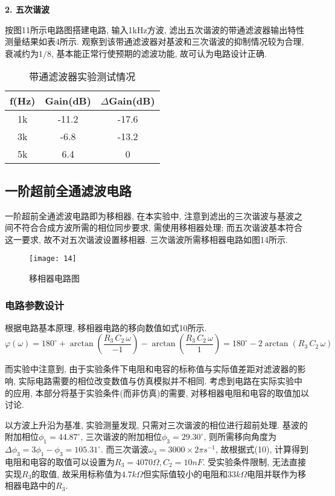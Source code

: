 \documentclass[UTF2]{ctexart}
\begin{document}
	\textbf{2. 五次谐波}
	
	按图11所示电路图搭建电路, 输入1kHz方波, 滤出五次谐波的带通滤波器输出特性测量结果如表4所示. 观察到该带通滤波器对基波和三次谐波的抑制情况较为合理, 衰减约为$1/8$, 基本能正常行使预期的滤波功能, 故可认为电路设计正确.
	
	\begin{table}[h]
		\centering
		\caption{带通滤波器实验测试情况}
		\begin{tabular}{c c c}
			\hline
			f(Hz) & Gain(dB) & $\Delta$Gain(dB)  \\
			\hline
			1k & -11.2 & -17.6 \\
			3k & -6.8 & -13.2 \\
			5k & 6.4 & 0 \\
			\hline
		\end{tabular}
	\end{table}
	
	\subsection{一阶超前全通滤波电路} 
	
	一阶超前全通滤波电路即为移相器, 在本实验中, 注意到滤出的三次谐波与基波之间不符合合成方波所需的相位同步要求, 需使用移相器处理; 而五次谐波基本符合这一要求, 故不对五次谐波设置移相器. 三次谐波所需移相器电路如图14所示. 
	
	\begin{figure}[h]
		\centering
		\texttt{[image: 14]}
		\caption{移相器电路图}
	\end{figure}
	
	\subsubsection{电路参数设计}
	
	根据电路基本原理, 移相器电路的移向数值如式10所示.
	\begin{equation}
		\varphi (\omega) = 180^\circ + \arctan \left( \frac{R_3 \, C_2 \, \omega}{-1} \right) - \arctan \left( \frac{R_3 \, C_2 \, \omega}{1} \right) = 180^\circ - 2\arctan (R_3 \, C_2 \, \omega)
	\end{equation}
	
	而实验中注意到, 由于实验条件下电阻和电容的标称值与实际值差距对滤波器的影响, 实际电路需要的相位改变数值与仿真模拟并不相同. 考虑到电路在实际实验中的应用, 本部分将基于实验条件(而非仿真)的需要, 对移相器电阻和电容的取值加以讨论. 
	
	以方波上升沿为基准, 实验测量发现, 只需对三次谐波的相位进行超前处理. 基波的附加相位$\phi_1 = 44.87^\circ$, 三次谐波的附加相位$\phi_3 = 29.30^\circ$, 则所需移向角度为$\Delta \phi_3 = 3\phi_1 - \phi_3 = 105.31^\circ$. 而三次谐波$\omega_3 = 3000 \times 2\pi s^{-1}$, 故根据式(10), 计算得到电阻和电容的取值可以设置为$R_3 = 4070 \Omega, C_2 = 10nF$. 受实验条件限制, 无法直接实现$R_3$的取值, 故采用标称值为$4.7k\Omega$但实际值较小的电阻和$33k\Omega$电阻并联作为移相器电路中的$R_3$. 
	
\end{document}
